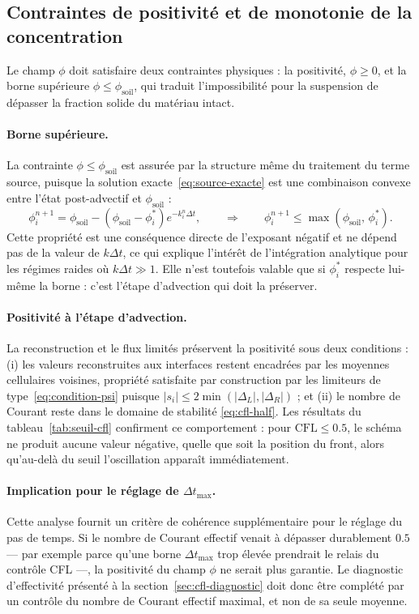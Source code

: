 \documentclass[11pt,a4paper]{report}
\newcommand{\phisol}{\phi_{\mathrm{soil}}}
\newcommand{\dt}{\Delta t}
\begin{document}
\subsection{Contraintes de positivité et de monotonie de la concentration}
\label{sec:positivite}

Le champ \(\phi\) doit satisfaire deux contraintes physiques : la positivité, \(\phi \ge 0\), et la borne
supérieure \(\phi \le \phisol\), qui traduit l'impossibilité pour la suspension de dépasser la fraction
solide du matériau intact.

\paragraph{Borne supérieure.} La contrainte \(\phi \le \phisol\) est assurée par la structure même du
traitement du terme source, puisque la solution exacte~\eqref{eq:source-exacte} est une combinaison
convexe entre l'état post-advectif et \(\phisol\) :
\begin{equation}
\phi_i^{n+1} = \phisol - \left(\phisol - \phi_i^*\right)e^{-k_i^n\dt},
\qquad\Longrightarrow\qquad
\phi_i^{n+1} \le \max\left(\phisol,\, \phi_i^*\right).
\label{eq:borne-sup}
\end{equation}
Cette propriété est une conséquence directe de l'exposant négatif et ne dépend pas de la valeur de
\(k\dt\), ce qui explique l'intérêt de l'intégration analytique pour les régimes raides où
\(k\dt \gg 1\). Elle n'est toutefois valable que si \(\phi_i^*\) respecte lui-même la borne : c'est
l'étape d'advection qui doit la préserver.

\paragraph{Positivité à l'étape d'advection.} La reconstruction et le flux limités préservent la
positivité sous deux conditions : (i) les valeurs reconstruites aux interfaces restent encadrées par les
moyennes cellulaires voisines, propriété satisfaite par construction par les limiteurs de
type~\eqref{eq:condition-psi} puisque \(|s_i| \le 2\min(|\Delta_L|,|\Delta_R|)\) ; et (ii) le nombre de
Courant reste dans le domaine de stabilité \eqref{eq:cfl-half}. Les résultats du
tableau~\ref{tab:seuil-cfl} confirment ce comportement : pour \(\mathrm{CFL} \le 0.5\), le schéma ne
produit aucune valeur négative, quelle que soit la position du front, alors qu'au-delà du seuil
l'oscillation apparaît immédiatement.

\paragraph{Implication pour le réglage de \(\Delta t_{\max}\).} Cette analyse fournit un critère de
cohérence supplémentaire pour le réglage du pas de temps. Si le nombre de Courant effectif venait à
dépasser durablement \(0.5\) — par exemple parce qu'une borne \(\dt_{\max}\) trop élevée prendrait le
relais du contrôle CFL —, la positivité du champ \(\phi\) ne serait plus garantie. Le diagnostic
d'effectivité présenté à la section~\ref{sec:cfl-diagnostic} doit donc être complété par un contrôle du
nombre de Courant effectif maximal, et non de sa seule moyenne.
\end{document}
